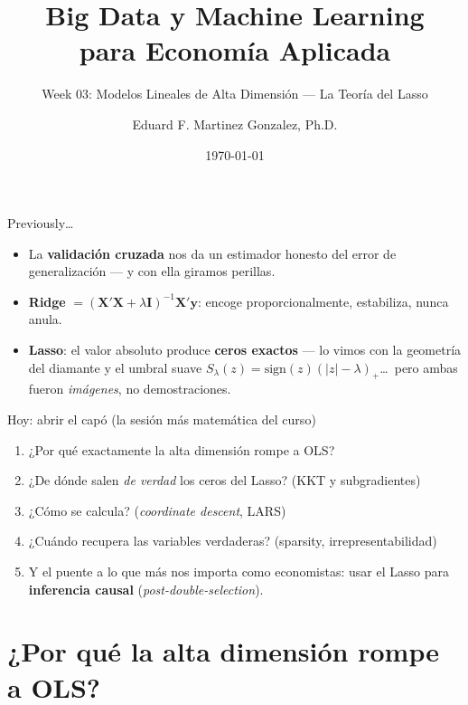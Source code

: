 \documentclass{beamer}
\title[BDML]{Big Data y Machine Learning \\ para Economía Aplicada}
\subtitle{Week 03: Modelos Lineales de Alta Dimensión --- La Teoría del Lasso}
\author{Eduard F. Martinez Gonzalez, Ph.D.}
\institute[]{Departamento de Economía, Universidad Icesi}
\date{\today}
\newcommand{\1}{\mathbb{I}}
\newcommand{\sign}{\mathrm{sign}}
\begin{document}
\begin{frame}
\titlepage
\end{frame}

\begin{frame}{Previously\ldots}
\small
\begin{itemize}\itemsep5pt
  \item La \textbf{validación cruzada} nos da un estimador honesto del error de generalización --- y con ella giramos perillas.
  \item \textbf{Ridge} $= (\mathbf{X}'\mathbf{X} + \lambda\mathbf{I})^{-1}\mathbf{X}'\mathbf{y}$: encoge proporcionalmente, estabiliza, nunca anula.
  \item \textbf{Lasso}: el valor absoluto produce \textbf{ceros exactos} --- lo vimos con la geometría del diamante y el umbral suave $S_\lambda(z) = \sign(z)(|z|-\lambda)_+$\ldots\ pero ambas fueron \emph{imágenes}, no demostraciones.
\end{itemize}
\pause

\vspace{0.2cm}
\begin{block}{Hoy: abrir el capó (la sesión más matemática del curso)}
\begin{enumerate}\itemsep2pt
  \item ¿Por qué exactamente la alta dimensión rompe a OLS?
  \item ¿De dónde salen \emph{de verdad} los ceros del Lasso? (KKT y subgradientes)
  \item ¿Cómo se calcula? (\emph{coordinate descent}, LARS)
  \item ¿Cuándo recupera las variables verdaderas? (sparsity, irrepresentabilidad)
  \item Y el puente a lo que más nos importa como economistas: usar el Lasso para \textbf{inferencia causal} (\emph{post-double-selection}).
\end{enumerate}
\end{block}
\end{frame}


\section{¿Por qué la alta dimensión rompe a OLS?}
\begin{frame}[noframenumbering]
\tableofcontents[currentsection]
\end{frame}
\end{document}
